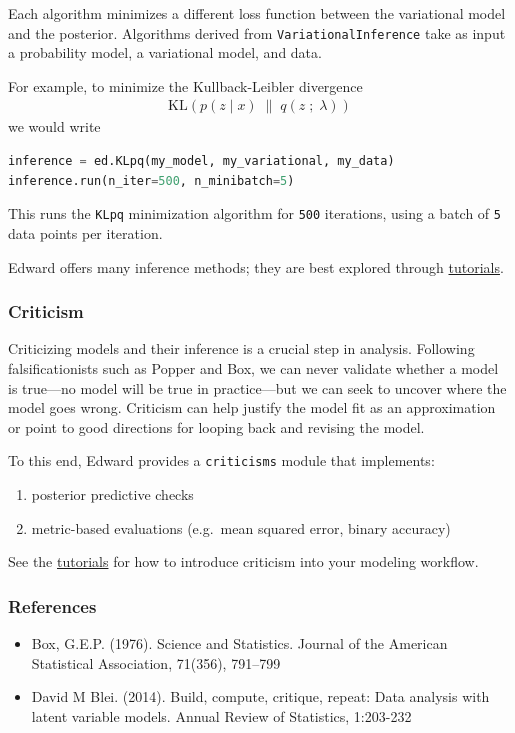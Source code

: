 Each algorithm minimizes a different loss function between the variational model
and the posterior. Algorithms derived from \texttt{VariationalInference}
take as input a probability model, a variational model, and data.

For example, to minimize the Kullback-Leibler divergence
\begin{align*}
  \text{KL}(p(z \mid x) \;\|\; q(z \;;\; \lambda))
\end{align*}
we would write
\begin{lstlisting}[language=Python]
inference = ed.KLpq(my_model, my_variational, my_data)
inference.run(n_iter=500, n_minibatch=5)
\end{lstlisting}
This runs the \texttt{KLpq} minimization algorithm for \texttt{500} iterations,
using a batch of \texttt{5} data points per iteration.

Edward offers many inference methods; they are best explored through
\href{tutorials.html}{tutorials}.

\subsubsection{Criticism}\label{criticism}

Criticizing models and their inference is a crucial step in analysis.
Following
falsificationists such as Popper and Box, we can never validate
whether a model is true---no model will be true in practice---but we
can seek to uncover where the model goes wrong. Criticism can
help justify the model fit as an approximation or point to good directions
for looping back and revising the model.

To this end, Edward provides a \texttt{criticisms} module that implements:
\begin{enumerate}
  \item posterior predictive checks
  \item metric-based evaluations (e.g.~mean squared error, binary accuracy)
\end{enumerate}

See the \href{tutorials.html}{tutorials} for how to introduce criticism into
your modeling workflow.

\subsubsection{References}\label{references}

\begin{itemize}
\item
  Box, G.E.P. (1976). Science and Statistics. Journal of the American
  Statistical Association, 71(356), 791–799
\item
  David M Blei. (2014). Build, compute, critique, repeat: Data analysis with
  latent variable models. Annual Review of Statistics, 1:203-232
\end{itemize}
